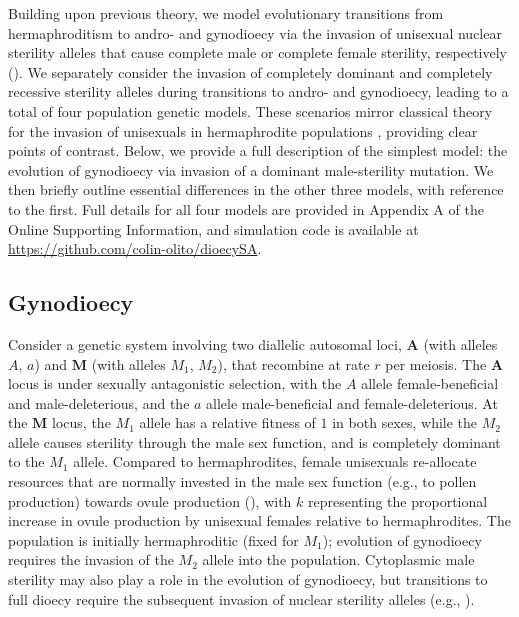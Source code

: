 \documentclass{article}
\begin{document}
Building upon previous theory, we model evolutionary transitions from hermaphroditism to andro- and gynodioecy via the invasion of unisexual nuclear sterility alleles that cause complete male or complete female sterility, respectively (\citealt{Charlesworth1978a}). We separately consider the invasion of completely dominant and completely recessive sterility alleles during transitions to andro- and gynodioecy, leading to a total of four population genetic models. These scenarios mirror classical theory for the invasion of unisexuals in hermaphrodite populations \citep{Charlesworth1978a}, providing clear points of contrast. Below, we provide a full description of the simplest model: the evolution of gynodioecy via invasion of a dominant male-sterility mutation. We then briefly outline essential differences in the other three models, with reference to the first. Full details for all four models are provided in Appendix A of the Online Supporting Information, and simulation code is available at \url{https://github.com/colin-olito/dioecySA}.

\subsection*{Gynodioecy}

Consider a genetic system involving two diallelic autosomal loci, $\mathbf{A}$ (with alleles $A$, $a$) and $\mathbf{M}$ (with alleles $M_1$, $M_2$), that recombine at rate $r$ per meiosis. The $\mathbf{A}$ locus is under sexually antagonistic selection, with the $A$ allele female-beneficial and male-deleterious, and the $a$ allele male-beneficial and female-deleterious. At the $\mathbf{M}$ locus, the $M_1$ allele has a relative fitness of $1$ in both sexes, while the $M_2$ allele causes sterility through the male sex function, and is completely dominant to the $M_1$ allele. Compared to hermaphrodites, female unisexuals re-allocate resources that are normally invested in the male sex function (e.g., to pollen production) towards ovule production (\citealt{Lloyd1975,Lloyd1976,Charlesworth1978a}), with $k$ representing the proportional increase in ovule production by unisexual females relative to hermaphrodites. The population is initially hermaphroditic (fixed for $M_1$); evolution of gynodioecy requires the invasion of the $M_2$ allele into the population. Cytoplasmic male sterility may also play a role in the evolution of gynodioecy, but transitions to full dioecy require the subsequent invasion of nuclear sterility alleles (e.g., \citealt{Lewis1941,Frank1989,Charlesworth2006,Charlesworth2002}).
\end{document}
